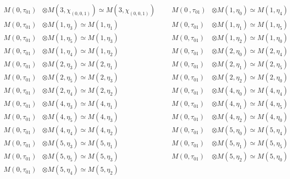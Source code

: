 \begin{align*}
M(0,\tau_{01}) &\otimes M(3,\chi_{(0,0,1)}) \simeq M(3,\chi_{(0,0,1)}) &&& M(0\
,\tau_{01}) &\otimes M(1,\eta_{0}) \simeq M(1,\eta_{4})\\
M(0,\tau_{01}) &\otimes M(1,\eta_{3}) \simeq M(1,\eta_{1}) &&& M(0,\tau_{01}) \
&\otimes M(1,\eta_{1}) \simeq M(1,\eta_{5})\\
M(0,\tau_{01}) &\otimes M(1,\eta_{5}) \simeq M(1,\eta_{3}) &&& M(0,\tau_{01}) \
&\otimes M(1,\eta_{2}) \simeq M(1,\eta_{0})\\
M(0,\tau_{01}) &\otimes M(1,\eta_{4}) \simeq M(1,\eta_{2}) &&& M(0,\tau_{01}) \
&\otimes M(2,\eta_{0}) \simeq M(2,\eta_{4})\\
M(0,\tau_{01}) &\otimes M(2,\eta_{3}) \simeq M(2,\eta_{1}) &&& M(0,\tau_{01}) \
&\otimes M(2,\eta_{1}) \simeq M(2,\eta_{5})\\
M(0,\tau_{01}) &\otimes M(2,\eta_{5}) \simeq M(2,\eta_{3}) &&& M(0,\tau_{01}) \
&\otimes M(2,\eta_{2}) \simeq M(2,\eta_{0})\\
M(0,\tau_{01}) &\otimes M(2,\eta_{4}) \simeq M(2,\eta_{2}) &&& M(0,\tau_{01}) \
&\otimes M(4,\eta_{0}) \simeq M(4,\eta_{4})\\
M(0,\tau_{01}) &\otimes M(4,\eta_{3}) \simeq M(4,\eta_{1}) &&& M(0,\tau_{01}) \
&\otimes M(4,\eta_{1}) \simeq M(4,\eta_{5})\\
M(0,\tau_{01}) &\otimes M(4,\eta_{5}) \simeq M(4,\eta_{3}) &&& M(0,\tau_{01}) \
&\otimes M(4,\eta_{2}) \simeq M(4,\eta_{0})\\
M(0,\tau_{01}) &\otimes M(4,\eta_{4}) \simeq M(4,\eta_{2}) &&& M(0,\tau_{01}) \
&\otimes M(5,\eta_{0}) \simeq M(5,\eta_{4})\\
M(0,\tau_{01}) &\otimes M(5,\eta_{3}) \simeq M(5,\eta_{1}) &&& M(0,\tau_{01}) \
&\otimes M(5,\eta_{1}) \simeq M(5,\eta_{5})\\
M(0,\tau_{01}) &\otimes M(5,\eta_{5}) \simeq M(5,\eta_{3}) &&& M(0,\tau_{01}) \
&\otimes M(5,\eta_{2}) \simeq M(5,\eta_{0})\\
M(0,\tau_{01}) &\otimes M(5,\eta_{4}) \simeq M(5,\eta_{2})\\
\end{align*}

